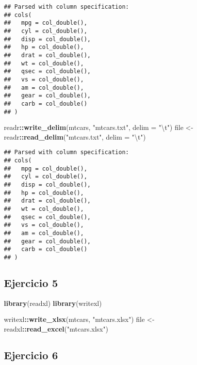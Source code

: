 \documentclass[]{book}
\newenvironment{Shaded}{\begin{snugshade}}{\end{snugshade}}
\newcommand{\CharTok}[1]{\textcolor[rgb]{0.31,0.60,0.02}{#1}}
\newcommand{\DataTypeTok}[1]{\textcolor[rgb]{0.13,0.29,0.53}{#1}}
\newcommand{\KeywordTok}[1]{\textcolor[rgb]{0.13,0.29,0.53}{\textbf{#1}}}
\newcommand{\NormalTok}[1]{#1}
\newcommand{\OperatorTok}[1]{\textcolor[rgb]{0.81,0.36,0.00}{\textbf{#1}}}
\newcommand{\StringTok}[1]{\textcolor[rgb]{0.31,0.60,0.02}{#1}}
\begin{document}
\begin{verbatim}
## Parsed with column specification:
## cols(
##   mpg = col_double(),
##   cyl = col_double(),
##   disp = col_double(),
##   hp = col_double(),
##   drat = col_double(),
##   wt = col_double(),
##   qsec = col_double(),
##   vs = col_double(),
##   am = col_double(),
##   gear = col_double(),
##   carb = col_double()
## )
\end{verbatim}

\begin{Shaded}
\begin{Highlighting}[]
\NormalTok{readr}\OperatorTok{::}\KeywordTok{write_delim}\NormalTok{(mtcars, }\StringTok{"mtcars.txt"}\NormalTok{, }\DataTypeTok{delim =} \StringTok{"}\CharTok{\textbackslash{}t}\StringTok{"}\NormalTok{)}
\NormalTok{file <-}\StringTok{ }\NormalTok{readr}\OperatorTok{::}\KeywordTok{read_delim}\NormalTok{(}\StringTok{"mtcars.txt"}\NormalTok{, }\DataTypeTok{delim =} \StringTok{"}\CharTok{\textbackslash{}t}\StringTok{"}\NormalTok{)}
\end{Highlighting}
\end{Shaded}

\begin{verbatim}
## Parsed with column specification:
## cols(
##   mpg = col_double(),
##   cyl = col_double(),
##   disp = col_double(),
##   hp = col_double(),
##   drat = col_double(),
##   wt = col_double(),
##   qsec = col_double(),
##   vs = col_double(),
##   am = col_double(),
##   gear = col_double(),
##   carb = col_double()
## )
\end{verbatim}

\hypertarget{ejercicio-5}{%
\subsection{Ejercicio 5}\label{ejercicio-5}}

\begin{Shaded}
\begin{Highlighting}[]
\KeywordTok{library}\NormalTok{(readxl)}
\KeywordTok{library}\NormalTok{(writexl)}

\NormalTok{writexl}\OperatorTok{::}\KeywordTok{write_xlsx}\NormalTok{(mtcars, }\StringTok{"mtcars.xlsx"}\NormalTok{)}
\NormalTok{file <-}\StringTok{ }\NormalTok{readxl}\OperatorTok{::}\KeywordTok{read_excel}\NormalTok{(}\StringTok{"mtcars.xlsx"}\NormalTok{)}
\end{Highlighting}
\end{Shaded}

\hypertarget{ejercicio-6}{%
\subsection{Ejercicio 6}\label{ejercicio-6}}
\end{document}
